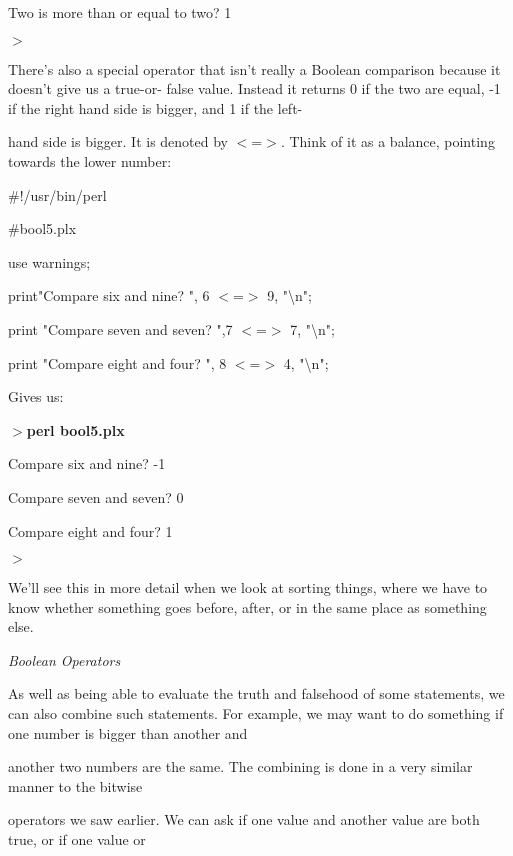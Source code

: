 \documentclass[a4paper,11pt]{book}
\begin{document}
\noindent Two is more than or equal to two? 1 

\noindent $>$

\noindent 

\noindent There's also a special operator that isn't really a Boolean comparison because it doesn't give us a true-or- false value. Instead it returns 0 if the two are equal, -1 if the right hand side is bigger, and 1 if the left-

\noindent hand side is bigger. It is denoted by $<$=$>$. Think of it as a balance, pointing towards the lower number:

\noindent 

\noindent \#!/usr/bin/perl

\noindent \#bool5.plx

\noindent use warnings;

\noindent print"Compare six and nine? ", 6 $<$=$>$ 9, "\textbackslash n";

\noindent print "Compare seven and seven? ",7 $<$=$>$ 7, "\textbackslash n";

\noindent print "Compare eight and four? ", 8 $<$=$>$ 4, "\textbackslash n";

\noindent 

\noindent Gives us:

\noindent 

\noindent $>$\textbf{perl bool5.plx}

\noindent Compare six and nine? -1

\noindent Compare seven and seven? 0

\noindent Compare eight and four? 1

\noindent $>$

\noindent 

\noindent We'll see this in more detail when we look at sorting things, where we have to know whether something goes before, after, or in the same place as something else.

\noindent 

\noindent \textit{Boolean Operators}

\noindent As well as being able to evaluate the truth and falsehood of some statements, we can also combine such statements. For example, we may want to do something if one number is bigger than another and

\noindent another two numbers are the same. The combining is done in a very similar manner to the bitwise

\noindent operators we saw earlier. We can ask if one value and another value are both true, or if one value or
\end{document}
